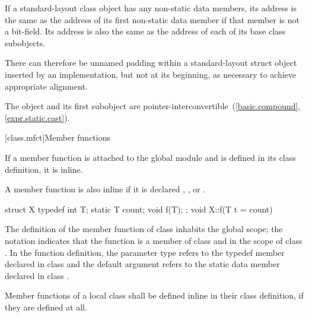 \pnum
If a standard-layout class object has any non-static data members, its address
is the same as the address of its first non-static data member
if that member is not a bit-field. Its
address is also the same as the address of each of its base class subobjects.
\begin{note}
There can therefore be unnamed padding within a standard-layout struct object
inserted by an implementation, but
not at its beginning, as necessary to achieve appropriate alignment.
\end{note}
\begin{note}
The object and its first subobject are
pointer-interconvertible~(\ref{basic.compound}, \ref{expr.static.cast}).
\end{note}

[class.mfct]{Member functions}%

\pnum
{}%
%
If a member function is attached to the global module and is defined in its class definition,
it is inline.
\begin{note}
A member function is also inline if it is declared
, , or .
\end{note}

\pnum
{}%
\begin{example}
\begin{codeblock}
struct X {
  typedef int T;
  static T count;
  void f(T);
};
void X::f(T t = count) { }
\end{codeblock}

The definition of the member function  of class  inhabits the global
scope; the notation  indicates that the function 
is a member of class  and in the scope of class . In
the function definition, the parameter type  refers to the
typedef member  declared in class  and the default
argument  refers to the static data member 
declared in class .
\end{example}

\pnum
{}%
Member functions of a local class shall be defined inline in their class
definition, if they are defined at all.

